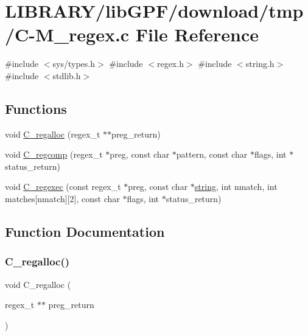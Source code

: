 \hypertarget{C-M__regex_8c}{}\section{L\+I\+B\+R\+A\+R\+Y/lib\+G\+P\+F/download/tmp/\+C-\/\+M\+\_\+regex.c File Reference}
\label{C-M__regex_8c}
{\ttfamily \#include $<$sys/types.\+h$>$}\newline
{\ttfamily \#include $<$regex.\+h$>$}\newline
{\ttfamily \#include $<$string.\+h$>$}\newline
{\ttfamily \#include $<$stdlib.\+h$>$}\newline
\subsection*{Functions}
\begin{DoxyCompactItemize}
\item 
void \hyperlink{C-M__regex_8c_a749eb5df717b312d898ea0a3b279e7ca}{C\+\_\+regalloc} (regex\+\_\+t $\ast$$\ast$preg\+\_\+return)
\item 
void \hyperlink{C-M__regex_8c_a3fcdbec663d5285a401e73c4cdca37be}{C\+\_\+regcomp} (regex\+\_\+t $\ast$preg, const char $\ast$pattern, const char $\ast$flags, int $\ast$status\+\_\+return)
\item 
void \hyperlink{C-M__regex_8c_ad4d383ae55d866605fb7ff11e8cf99d8}{C\+\_\+regexec} (const regex\+\_\+t $\ast$preg, const char $\ast$\hyperlink{what__overview_81_8txt_a74cb7e955273b9f9157b4f0c18a38849}{string}, int nmatch, int matches\mbox{[}nmatch\mbox{]}\mbox{[}2\mbox{]}, const char $\ast$flags, int $\ast$status\+\_\+return)
\end{DoxyCompactItemize}


\subsection{Function Documentation}
\mbox{\label{C-M__regex_8c_a749eb5df717b312d898ea0a3b279e7ca}} 
\subsubsection{\texorpdfstring{C\+\_\+regalloc()}{C\_regalloc()}}
{\footnotesize\ttfamily void C\+\_\+regalloc (\begin{DoxyParamCaption}\item[{regex\+\_\+t $\ast$$\ast$}]{preg\+\_\+return }\end{DoxyParamCaption})}

